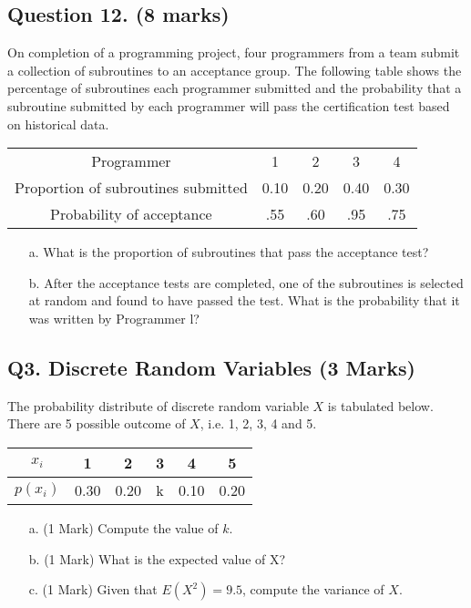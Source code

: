 \documentclass[]{report}
\begin{document}
\subsection*{Question 12. (8 marks) } %
On completion of a programming project, four programmers from a
team submit a collection of subroutines to an acceptance group. The
following table shows the percentage of subroutines each programmer
submitted and the probability that a subroutine submitted by each
programmer will pass the certification test based on historical data.
\begin{center}
	\begin{tabular}{|c|c|c|c|c|}
		\hline
		Programmer & 1 & 2 & 3 & 4 \\
		Proportion of subroutines submitted & 0.10 & 0.20 & 0.40 & 0.30 \\
		Probability of acceptance & .55 & .60 & .95 & .75 \\
		\hline
	\end{tabular}
\end{center}
\begin{itemize}
	\item[a.] What is the proportion of subroutines that pass the acceptance test?
	\item[b.] After the acceptance tests are completed, one of the subroutines is
	selected at random and found to have passed the test. What is the
	probability that it was written by Programmer l?
\end{itemize}





\subsection*{Q3. Discrete Random Variables (3 Marks)} %
The probability distribute of discrete random variable $X$ is tabulated below. There are 5 possible outcome of $X$, i.e. 1, 2, 3, 4 and 5.
\begin{center}
	\begin{tabular}{|c||c|c|c|c|c|}
		\hline
		$x_i$  & 1 & 2 & 3 & 4 & 5  \\\hline
		$p(x_i)$ & 0.30 & 0.20 & k & 0.10 & 0.20 \\
		\hline
	\end{tabular}
\end{center}

\begin{itemize}
	\item[a.] (1 Mark) Compute the value of $k$.
	\item[b.] (1 Mark) What is the expected value of X?
	\item[c.] (1 Mark) Given that $E(X^2) = 9.5$, compute the variance of $X$.
\end{itemize}
\newpage
\end{document}
